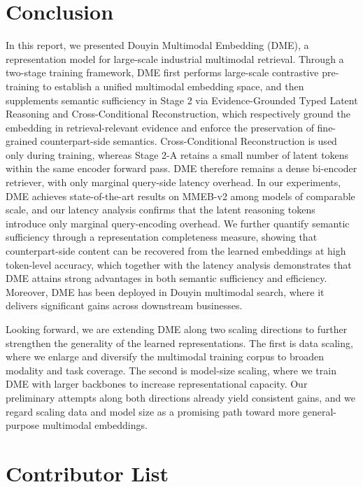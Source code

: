 \section{Conclusion}
\label{sec:conclusion}

In this report, we presented Douyin Multimodal Embedding (DME), a representation model for large-scale industrial multimodal retrieval. Through a two-stage training framework, DME first performs large-scale contrastive pre-training to establish a unified multimodal embedding space, and then supplements semantic sufficiency in Stage 2 via Evidence-Grounded Typed Latent Reasoning and Cross-Conditional Reconstruction, which respectively ground the embedding in retrieval-relevant evidence and enforce the preservation of fine-grained counterpart-side semantics. Cross-Conditional Reconstruction is used only during training, whereas Stage 2-A
retains a small number of latent tokens within the same encoder forward pass.
DME therefore remains a dense bi-encoder retriever, with only marginal
query-side latency overhead. In our experiments, DME achieves state-of-the-art results on MMEB-v2 among models of comparable scale, and our latency analysis confirms that the latent reasoning tokens introduce only marginal query-encoding overhead. We further quantify semantic sufficiency through a representation completeness measure, showing that counterpart-side content can be recovered from the learned embeddings at high token-level accuracy, which together with the latency analysis demonstrates that DME attains strong advantages in both semantic sufficiency and efficiency. Moreover, DME has been deployed in Douyin multimodal search, where it delivers significant gains across downstream businesses.

Looking forward, we are extending DME along two scaling directions to further strengthen the generality of the learned representations. The first is data scaling, where we enlarge and diversify the multimodal training corpus to broaden modality and task coverage. The second is model-size scaling, where we train DME with larger backbones to increase representational capacity. Our preliminary attempts along both directions already yield consistent gains, and we regard scaling data and model size as a promising path toward more general-purpose multimodal embeddings.



\newpage

\section{Contributor List}


